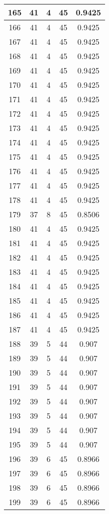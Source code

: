 \documentclass[letterpaper, 12pt]{article}
\begin{document}
\begin{longtable}{|c|c|c|c|c|}
\hline
165 & 41 & 4 & 45 & 0.9425 \\
\hline
166 & 41 & 4 & 45 & 0.9425 \\
\hline
167 & 41 & 4 & 45 & 0.9425 \\
\hline
168 & 41 & 4 & 45 & 0.9425 \\
\hline
169 & 41 & 4 & 45 & 0.9425 \\
\hline
170 & 41 & 4 & 45 & 0.9425 \\
\hline
171 & 41 & 4 & 45 & 0.9425 \\
\hline
172 & 41 & 4 & 45 & 0.9425 \\
\hline
173 & 41 & 4 & 45 & 0.9425 \\
\hline
174 & 41 & 4 & 45 & 0.9425 \\
\hline
175 & 41 & 4 & 45 & 0.9425 \\
\hline
176 & 41 & 4 & 45 & 0.9425 \\
\hline
177 & 41 & 4 & 45 & 0.9425 \\
\hline
178 & 41 & 4 & 45 & 0.9425 \\
\hline
179 & 37 & 8 & 45 & 0.8506 \\
\hline
180 & 41 & 4 & 45 & 0.9425 \\
\hline
181 & 41 & 4 & 45 & 0.9425 \\
\hline
182 & 41 & 4 & 45 & 0.9425 \\
\hline
183 & 41 & 4 & 45 & 0.9425 \\
\hline
184 & 41 & 4 & 45 & 0.9425 \\
\hline
185 & 41 & 4 & 45 & 0.9425 \\
\hline
186 & 41 & 4 & 45 & 0.9425 \\
\hline
187 & 41 & 4 & 45 & 0.9425 \\
\hline
188 & 39 & 5 & 44 & 0.907 \\
\hline
189 & 39 & 5 & 44 & 0.907 \\
\hline
190 & 39 & 5 & 44 & 0.907 \\
\hline
191 & 39 & 5 & 44 & 0.907 \\
\hline
192 & 39 & 5 & 44 & 0.907 \\
\hline
193 & 39 & 5 & 44 & 0.907 \\
\hline
194 & 39 & 5 & 44 & 0.907 \\
\hline
195 & 39 & 5 & 44 & 0.907 \\
\hline
196 & 39 & 6 & 45 & 0.8966 \\
\hline
197 & 39 & 6 & 45 & 0.8966 \\
\hline
198 & 39 & 6 & 45 & 0.8966 \\
\hline
199 & 39 & 6 & 45 & 0.8966 \\
\hline
\end{longtable}
\end{document}
